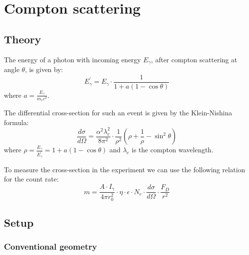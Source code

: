 \documentclass[a4paper,12pt]{article}
\begin{document}
\clearpage
\section{Compton scattering}

\subsection{Theory}
The energy of a photon with incoming energy $E_\gamma$, after compton scattering at angle $\theta$, is given by: 
\begin{equation}
	E_\gamma^\prime = E_\gamma \cdot \frac{1}{1+a(1-\cos\theta)} 
\end{equation}
where $a = \frac{E_\gamma}{m_e c^2}$.

The differential cross-section for such an event is given by the Klein-Nishina formula:
\begin{equation}
	\frac{d\sigma}{d\Omega} = \frac{\alpha^2\lambda_e^2}{8\pi^2} \cdot\frac{1}{\rho^2} (\rho+\frac{1}{\rho}-\sin^2\theta)
\end{equation}
where $\rho=\frac{E_\gamma}{E_\gamma^\prime} = 1+a(1-\cos\theta)$ and $\lambda_e$ is the compton wavelength.

To measure the cross-section in the experiment we can use the following relation for the count rate:
\begin{equation}
	m = \frac{A \cdot I_\gamma}{4 \pi r_0^2} \cdot \eta \cdot \epsilon \cdot N_e \cdot \frac{d\sigma}{d\Omega} \cdot \frac{F_D}{r^2}
\end{equation}

\subsection{Setup}

\subsubsection{Conventional geometry}
\end{document}
